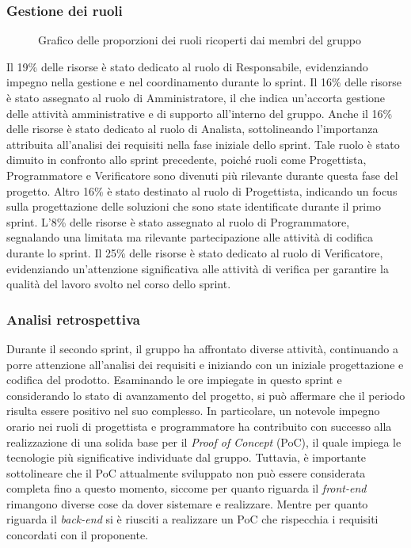 \subsubsection{Gestione dei ruoli}

\begin{figure}[h]
	\centering
	\caption{Grafico delle proporzioni dei ruoli ricoperti dai membri del gruppo}
\end{figure}

Il 19\% delle risorse è stato dedicato al ruolo di Responsabile, evidenziando impegno nella gestione e nel coordinamento durante lo sprint.
Il 16\% delle risorse è stato assegnato al ruolo di Amministratore, il che indica un'accorta gestione delle attività amministrative 
e di supporto all'interno del gruppo.
Anche il 16\% delle risorse è stato dedicato al ruolo di Analista, sottolineando l'importanza attribuita all'analisi 
dei requisiti nella fase iniziale dello sprint. Tale ruolo è stato dimuito in confronto allo sprint precedente, poiché ruoli come Progettista, 
Programmatore e Verificatore sono divenuti più rilevante durante questa fase del progetto.
Altro 16\% è stato destinato al ruolo di Progettista, indicando un focus sulla progettazione delle soluzioni che sono state identificate durante il primo sprint.
L'8\% delle risorse è stato assegnato al ruolo di Programmatore, segnalando una limitata ma rilevante partecipazione alle 
attività di codifica durante lo sprint.
Il 25\% delle risorse è stato dedicato al ruolo di Verificatore, evidenziando un'attenzione significativa alle attività di 
verifica per garantire la qualità del lavoro svolto nel corso dello sprint.

\subsubsection{Analisi retrospettiva}

Durante il secondo sprint, il gruppo ha affrontato diverse attività, continuando a porre attenzione all'analisi dei requisiti e iniziando con un iniziale progettazione e codifica del prodotto. 
Esaminando le ore impiegate in questo sprint e considerando lo stato di avanzamento del progetto, si può affermare che il periodo risulta essere positivo nel suo complesso. 
In particolare, un notevole impegno orario nei ruoli di progettista e programmatore ha contribuito con successo alla realizzazione di una solida base per il \textit{Proof of Concept} (PoC),
il quale impiega le tecnologie più significative individuate dal gruppo. Tuttavia, è importante sottolineare che il PoC attualmente sviluppato non può 
essere considerata completa fino a questo momento, siccome per quanto riguarda il \textit{front-end} rimangono diverse cose da dover sistemare e realizzare.
Mentre per quanto riguarda il \textit{back-end} si è riusciti a realizzare un PoC che rispecchia i requisiti concordati con il proponente.

